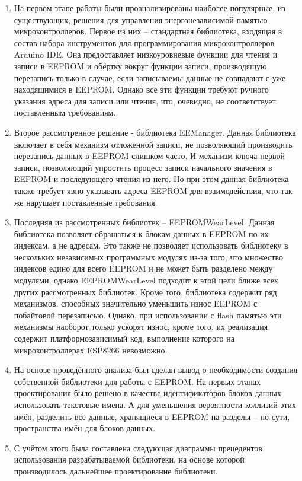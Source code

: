 \documentclass[14pt]{extarticle}
\begin{document}
\begin{enumerate}
	\item На первом этапе работы были проанализированы наиболее популярные, из существующих, решения для управления энергонезависимой памятью микроконтроллеров. 
	Первое из них -- стандартная библиотека, входящая в состав набора инструментов для программирования микроконтроллеров Arduino IDE.
	Она предоставляет низкоуровневые функции для чтения и записи в EEPROM и обёртку вокруг функции записи, производящую перезапись только в случае, если записываемы данные не совпадают с уже находящимися в EEPROM.
	Однако все эти функции требуют ручного указания адреса для записи или чтения, что, очевидно, не соответствует поставленным требованиям. 
	\item Второе рассмотренное решение - библиотека EEManager.
	Данная библиотека включает в себя механизм отложенной записи, не позволяющий производить перезапись данных в EEPROM слишком часто.
	И механизм ключа первой записи, позволяющий упростить процесс записи начального значения в EEPROM и последующего чтения из него.
	Но при этом данная библиотека также требует явно указывать адреса EEPROM для взаимодействия, что так же нарушает поставленные требования.
	\item Последняя из рассмотренных библиотек -- EEPROMWearLevel.
	Данная библиотека позволяет обращаться к блокам данных в EEPROM по их индексам, а не адресам.
	Это также не позволяет использовать библиотеку в нескольких независимых программных модулях из-за того, что множество индексов едино для всего EEPROM и не может быть разделено между модулями, однако EEPROMWearLevel подходит к этой цели ближе всех других рассмотренных библиотек.
	Кроме того, библиотека содержит ряд механизмов, способных значительно уменьшить износ EEPROM с побайтовой перезаписью.
	Однако, при использовании с flash памятью эти механизмы наоборот только ускорят износ, кроме того, их реализация содержит платформозависимый код, выполнение которого на микроконтроллерах ESP8266 невозможно.
	\item На основе проведённого анализа был сделан вывод о необходимости создания собственной библиотеки для работы с EEPROM. На первых этапах проектирования было решено в качестве идентификаторов блоков данных использовать текстовые имена.
	А для уменьшения вероятности коллизий этих имён, разделить все данные, хранящиеся в EEPROM на разделы -- по сути, пространства имён для блоков данных.
	\item С учётом этого была составлена следующая диаграммы прецедентов использования разрабатываемой библиотеки, на основе которой производилось дальнейшее проектирование библиотеки.

\end{enumerate}
\end{document}
